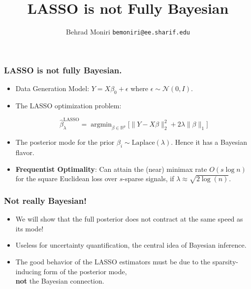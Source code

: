 \documentclass[usenames,dvipsnames]{beamer}
\title[LASSO is not Fully Bayesian]{‌\vspace{0.5cm}\\
LASSO is not Fully Bayesian}
\author[Behrad Moniri]{
  Behrad Moniri
  \pdfnewline
  \texttt{bemoniri@ee.sharif.edu}
}
\institute{\small{EE Department, Sharif University of Technology}}
\date{}
\newcommand{\be}{\beta}
\newcommand{\la}{\lambda}
\newcommand{\argmin}{\mathop{\arg\min}}
\newcommand{\RR}{\mathbb{R}}
\begin{document}
\begin{frame}
\titlepage
\end{frame}


\begin{frame}
\frametitle{LASSO is not fully Bayesian.}

\begin{itemize}
	
	\item Data Generation Model: $Y = X\beta_0 + \epsilon$ where $\epsilon \sim \mathcal{N}(0, I)$.
	
	\item The LASSO optimization problem:
	
	\begin{equation}
	\label{EqLASSO} \hat{\be}^{\mathrm{LASSO}}_\la= \argmin_{\be\in\RR^p}
	\bigl[ \|Y-X\be\| _2^2 + 2\la\|\be\|_1
	\bigr]
	\end{equation}
	\item The posterior mode for the prior $\be_i \sim \mathrm{Laplace}(\la)$. Hence it has a Bayesian flavor.
	
	\item \textbf{Frequentist Optimality}: Can attain the (near) minimax rate $O(s \log n)$ for the square Euclidean loss over $s$-sparse signals, if $\lambda \approx \sqrt{2\log(n)}$.		
\end{itemize}
\end{frame}



\begin{frame}
	\frametitle{Not really Bayesian!}
	\begin{itemize}
		\item We will show that the full posterior does not contract at the same speed as its mode!
		
		\item Useless for uncertainty quantification, the central idea of Bayesian inference.
		
		\pause 
		\item The good behavior of the LASSO estimators must be due to the  sparsity-inducing form of the posterior mode,\\ \textbf{not} the Bayesian connection. 
	\end{itemize}
	
\end{frame}
\end{document}
